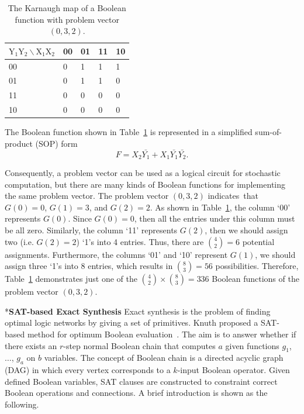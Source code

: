 \documentclass[conference,letterpaper]{IEEEtran}
\makeatletter
\renewcommand{\subsection}{\@startsection{subsection}{1}{0mm}
	{-\baselineskip}{0.001\baselineskip}{\bf\leftline}}
\makeatother
\begin{document}
\begin{table}[htbp]
\setlength{\abovecaptionskip}{0.cm}
\setlength{\belowcaptionskip}{0.pt}
\setlength{\tabcolsep}{1mm}
\caption{The Karnaugh map of a Boolean function with problem vector $(0, 3, 2)$.}
\centering \label{tab:tt}
\begin{tabularx}{\linewidth}{lXXXX}
\toprule
$\mathrm{Y}_{1} \mathrm{Y}_{2} \backslash \mathrm{X}_{1} \mathrm{X}_{2}$ & 00 & 01 & 11 & 10 \\
\midrule
00 &0 & 1 & 1 & 1 \\
01 &0 & 1 & 1 &0 \\
11 &0 & 0& 0&0 \\
10 &0 &0 & 0&0 \\
\bottomrule
\end{tabularx}
\end{table}

The Boolean function shown in Table~\ref{tab:tt} is represented in a simplified sum-of-product (SOP) form
\begin{equation}
F=X_{2}\bar{Y_{1}}+X_{1} \bar{Y_{1}}\bar{Y_{2}}.
\end{equation}

Consequently, a problem vector can be used as a logical circuit for stochastic computation, but there are many kinds of Boolean functions for implementing the same problem vector.
The problem vector $(0, 3, 2)$ indicates that $G(0)=0$, $G(1)=3$, and $G(2)=2$.
As shown in Table~\ref{tab:tt}, the column `00' represents $G(0)$. Since $G(0)=0$, then all the entries under this column must be all zero.
Similarly, the column `11' represents $G(2)$, then we should assign two (i.e. $G(2)=2$) `1's into 4 entries. Thus, there are $\binom{4}{2}=6$ potential assignments.
Furthermore, the columns `01' and `10' represent $G(1)$, we should assign three `1's into 8 entries, which results in $\binom{8}{3}=56$ possibilities.
Therefore, Table~\ref{tab:tt} demonstrates just one of the $\binom{4}{2} \times \binom{8}{3} = 336$ Boolean functions of the problem vector $(0, 3, 2)$.

\subsection*{\textbf{SAT-based Exact Synthesis}}
Exact synthesis is the problem of finding optimal logic networks by giving a set of primitives.
Knuth proposed a SAT-based method for optimum Boolean evaluation~\cite{4}. 
The aim is to answer whether if there exists an $r$-step normal Boolean chain that computes $a$ given functions $g_1$, $\ldots$, $g_a$ on $b$ variables. The concept of Boolean chain is a directed acyclic graph (DAG) in which every vertex corresponds to a $k$-input Boolean operator. 
Given defined Boolean variables, SAT clauses are constructed to constraint correct Boolean operations and connections.
A brief introduction is shown as the following. 
\end{document}
